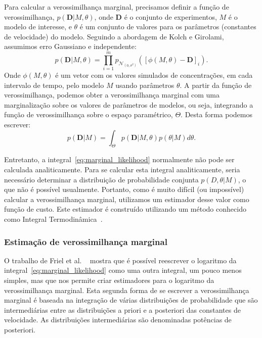 \documentclass[12pt]{article}
\begin{document}
Para calcular a verossimilhança marginal, precisamos definir a função de
verossimilhança, $p(\mathbf{D} | M, \theta)$, onde $\mathbf{D}$ é o 
conjunto de experimentos, $M$ é o modelo de interesse, e $\theta$ é um
conjunto de valores para os parâmetros (constantes de velocidade) do
modelo. Seguindo a abordagem de Kolch e Girolami, assumimos erro
Gaussiano e independente:
\begin{equation}
    p (\mathbf{D} | M, \theta) = \prod_{i = 1}^m
    p_{\mathcal{N}_{\left(0, \sigma^2\right)}} ([\phi (M,\theta) -
    \mathbf{D}]_i).
\label{eq:likelihood}
\end{equation}
Onde $\phi (M, \theta)$ é um vetor com os valores simulados de 
concentrações, em cada intervalo de tempo, pelo modelo $M$ usando 
parâmetros $\theta$. A partir da função de verossimilhança, podemos
obter a verossimilhança marginal com uma marginalização sobre os valores
de parâmetros de modelos, ou seja, integrando a função de 
verossimilhança sobre o espaço paramétrico, $\Theta$. Desta forma
podemos escrever:
\begin{equation}
    p (\mathbf{D} | M) = \int_{\Theta} p (\mathbf{D} | M, \theta) p
    (\theta | M)d\theta.
\label{eq:marginal_likelihood}
\end{equation}

Entretanto, a integral~\ref{eq:marginal_likelihood} normalmente não pode
ser calculada analiticamente. Para se calcular esta integral
analiticamente, seria necessário determinar a distribuição de 
probabilidade conjunta $p(D, \theta | M)$, o que não é possível
usualmente. Portanto, como é muito difícil (ou impossível) calcular a
verossimilhança marginal, utilizamos um estimador desse valor como 
função de custo. Este estimador é construído utilizando um método
conhecido como Integral Termodinâmica~\cite{Friel2008}.

\subsubsection{Estimação de verossimilhança marginal}
O trabalho de Friel et al. ~\cite{Friel2008} mostra que é possível
reescrever o logaritmo da integral~\ref{eq:marginal_likelihood} como uma 
outra integral, um pouco menos simples, mas que nos permite criar 
estimadores para o logaritmo da verossimilhança marginal. Esta segunda 
forma de se escrever a verossimilhança marginal é baseada na integração 
de várias distribuições de probabilidade que são intermediárias entre as 
distribuições a priori e a posteriori das constantes de velocidade. As 
distribuições intermediárias são denominadas potências de posteriori.
\end{document}
